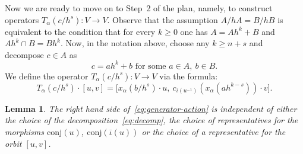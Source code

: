 \documentclass[oneside, 11pt]{amsart}
\numberwithin{equation}{section}
\newtheorem{lemma}{Lemma} \numberwithin{lemma}{section}
\theoremstyle{definition}
\theoremstyle{definition}
\theoremstyle{remark}
\begin{document}
Now we are ready to move on to Step~2 of the plan, namely, to construct operators $T_\alpha(c/h^s)\colon V\rightarrow V$. Observe that the assumption $A/hA = B/hB$ is equivalent to the condition that for every $k \geq 0$ one has $A = Ah^k + B$ and $Ah^k \cap B = Bh^k$. Now, in the notation above, choose any $k \geq n + s$ and decompose $c \in A$ as
 \begin{equation} \label{eq:decomp} c = ah^k + b\text{ for some }a \in A,\ b \in B. \end{equation}
We define the operator $T_\alpha(c/h^s) \colon V \to V$ via the formula:
\begin{equation}\label{eq:generator-action}
\textstyle
T_\alpha(c/{h^s}) \cdot [u, v] = \bigl[x_\alpha(b/{h^s})\cdot u,\ c_{\overline{\iota}(u^{-1})}(x_\alpha(ah^{k - s})) \cdot v\bigr].
\end{equation}
\begin{lemma}\label{well-def}
The right hand side of~\eqref{eq:generator-action} is independent of either the choice of the decomposition~\eqref{eq:decomp}, the choice of representatives for the morphisms $\mathrm{conj}(u)$, $\mathrm{conj}(\overline{\iota}(u))$ or the choice of a representative for the orbit $[u, v]$.
\end{lemma}
\end{document}
